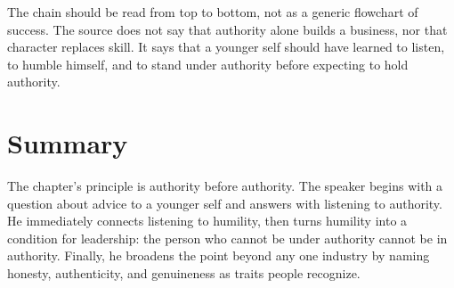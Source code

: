 The chain should be read from top to bottom, not as a generic flowchart of success. The source does not say that authority alone builds a business, nor that character replaces skill. It says that a younger self should have learned to listen, to humble himself, and to stand under authority before expecting to hold authority.

\section{Summary}

The chapter's principle is authority before authority. The speaker begins with a question about advice to a younger self and answers with listening to authority. He immediately connects listening to humility, then turns humility into a condition for leadership: the person who cannot be under authority cannot be in authority. Finally, he broadens the point beyond any one industry by naming honesty, authenticity, and genuineness as traits people recognize.